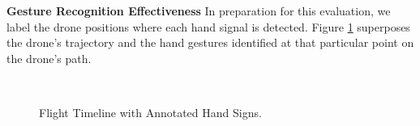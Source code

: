 \pagebreak

\textbf{Gesture Recognition Effectiveness } In preparation for this evaluation, we label the drone positions where each hand signal is detected. Figure \ref{fig:command_labels} superposes the drone's trajectory and the hand gestures identified at that particular point on the drone's path.


    

\begin{figure}[!h]
    \raggedright

    \\
    \caption{Flight Timeline with Annotated Hand Signs.}
    \label{fig:command_labels}
\end{figure}


